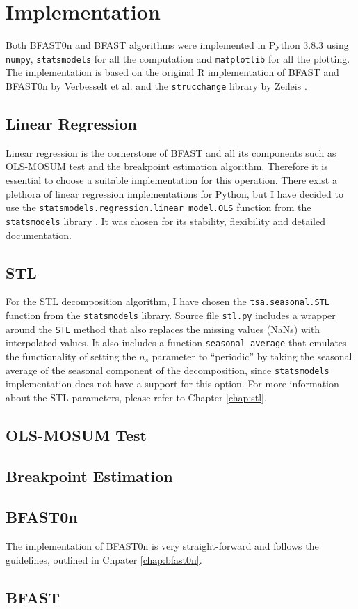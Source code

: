 \documentclass[main.tex]{subfiles}
\begin{document}
\chapter{Implementation}
\label{chap:implementation}
Both BFAST0n and BFAST algorithms were implemented in Python 3.8.3 using
\texttt{numpy}, \texttt{statsmodels}\cite{statsmodels} for all the computation
and \texttt{matplotlib} for all the plotting. The implementation is based on the
original R implementation of BFAST and BFAST0n by Verbesselt et al.
\cite{bfast-github} and the \texttt{strucchange} library by Zeileis
\cite{strucchange_code}.


\section{Linear Regression}
\label{sec:linear_regression}
Linear regression is the cornerstone of BFAST and all its components such as
OLS-MOSUM test and the breakpoint estimation algorithm. Therefore it is
essential to choose a suitable implementation for this operation. There exist a
plethora of linear regression implementations for Python, but I have decided to
use the \texttt{statsmodels.regression.linear\_model.OLS} function from the
\texttt{statsmodels} library \cite{statsmodels}. It was chosen for its
stability, flexibility and detailed documentation.

\section{STL}
\label{sec:impl_stl}
For the STL decomposition algorithm, I have chosen the \texttt{tsa.seasonal.STL} function
from the \texttt{statsmodels} library. Source file \texttt{stl.py} includes a
wrapper around the \texttt{STL} method that also replaces the missing values
(NaNs) with interpolated values. It also includes a function 
\texttt{seasonal\_average} that emulates the functionality of
setting the $n_s$ parameter to ``periodic'' by taking the seasonal average of
the seasonal component of the decomposition, since \texttt{statsmodels}
implementation does not have a support for this option. For more information
about the STL parameters, please refer to Chapter \ref{chap:stl}.

\section{OLS-MOSUM Test}
\label{sec:impl_mosum}


\section{Breakpoint Estimation}
\label{sec:impl_breakpoints}

\section{BFAST0n}
\label{sec:impl_bfast0n}
The implementation of BFAST0n is very straight-forward and follows the
guidelines, outlined in Chpater \ref{chap:bfast0n}.

\section{BFAST}
\label{sec:bfast}

\biblio
\end{document}
